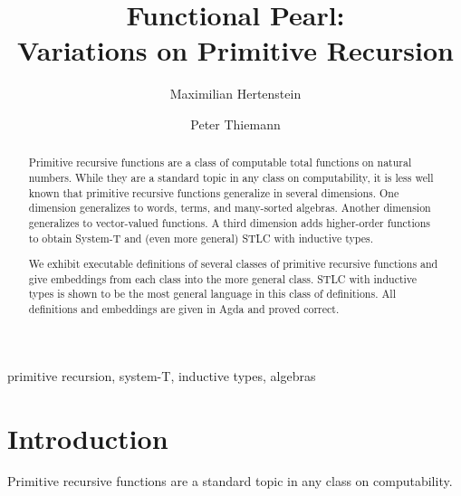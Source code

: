 \documentclass{jfp}
\begin{document}


\totalpg{\pageref{lastpage01}}

\title{Functional Pearl:\\ Variations on Primitive Recursion}

\begin{authgrp}
  \author{Maximilian Hertenstein}
  \author{Peter Thiemann}
\end{authgrp}


\begin{abstract}
Primitive recursive functions are a class of computable total
functions on natural numbers. While they are a standard topic in any
class on computability, it is less well known that primitive recursive
functions generalize in several dimensions. One dimension generalizes
to words, terms, and many-sorted algebras. Another dimension
generalizes to vector-valued functions. A third dimension adds
higher-order functions to obtain System-T and (even more general) STLC
with inductive types. 

We exhibit executable definitions of several classes of primitive
recursive functions and give embeddings from each class into the more
general class. STLC with inductive types is shown to be the most
general language in this class of definitions. All definitions and
embeddings are given in Agda and proved correct.
\end{abstract}
\begin{keywords}
primitive recursion, system-T, inductive types, algebras
\end{keywords}

\maketitle[F]

\section{Introduction}
\label{sec:introduction}

Primitive recursive functions are a standard topic in any class on
computability. 
\end{document}
